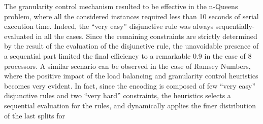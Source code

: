 \documentclass[preprint]{tlp}
\begin{document}
The granularity control mechanism resulted to be effective in the n-Queens problem,
where all the considered instances required less than 10 seconds of serial execution time.
Indeed, the ``very easy'' disjunctive rule was always sequentially-evaluated in all the cases.
Since the remaining constraints are strictly determined by the result of the evaluation
of the disjunctive rule, the unavoidable presence of a sequential part limited
the final efficiency to a remarkable 0.9 in the case of 8 processors.
A similar scenario can be observed in the case of Ramsey Numbers,
where the positive impact of the load balancing and granularity
control heuristics becomes very evident.
In fact, since the encoding is composed of few ``very easy'' disjunctive rules
and two ``very hard'' constraints, the heuristics selects a sequential evaluation
for the rules, and dynamically applies the finer distribution of the last splits for
\end{document}
